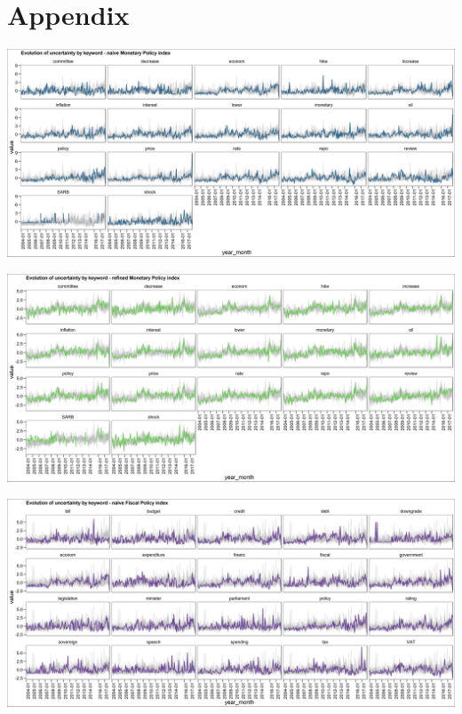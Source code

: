 \documentclass[11pt,preprint, authoryear]{elsarticle}
\let\origfigure\figure
\let\endorigfigure\endfigure
\renewenvironment{figure}[1][2] {
    \expandafter\origfigure\expandafter[H]
} {
    \endorigfigure
}
\numberwithin{equation}{section}
\numberwithin{figure}{section}
\numberwithin{table}{section}
\begin{document}
\section*{\texorpdfstring{Appendix
		\label{sec_appendix}}{Results }}\label{appendix}
\begin{figure}
	\centering
	\includegraphics[width=\linewidth, keepaspectratio]{bin/monetary_key_naive}\\
	
	\caption{Composite Monetary Policy uncertainty naive index. \label{fig_mon_key_n}}
\end{figure}

\begin{figure}
	\centering
	\includegraphics[width=\linewidth, keepaspectratio]{bin/monetary_key_refine}\\
	
	\caption{Composite Monetary Policy uncertainty refined index. \label{fig_mon_key_r}}
\end{figure}

\begin{figure}
	\centering
	\includegraphics[width=\linewidth, keepaspectratio]{bin/fiscal_key_naive}\\
	
	\caption{Composite Fiscal Policy uncertainty naive index. \label{fig_fis_key_n}}
\end{figure}
\end{document}

